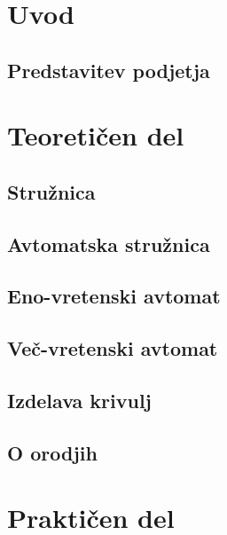 \documentclass[a4paper, 12pt, fleqn]{article}
\begin{document}
\begin{sloppypar}
	\section{Uvod}
	\subsection{Predstavitev podjetja}
	
	\newpage
	
	\section{Teoretičen del}
	\subsection{Stružnica}
	
	
	\subsection{Avtomatska stružnica}
	
	
	\subsection{Eno-vretenski avtomat}
	
	
	\subsection{Več-vretenski avtomat}
	
	
	\subsection{Izdelava krivulj}
	
	
	\subsection{O orodjih}
	
	
	\newpage
	\section{Praktičen del}
	
	
	
	
	
	
	
	
	
	
	
\end{sloppypar}

\newpage

\renewcommand{\refname}{Viri}



\end{document}
